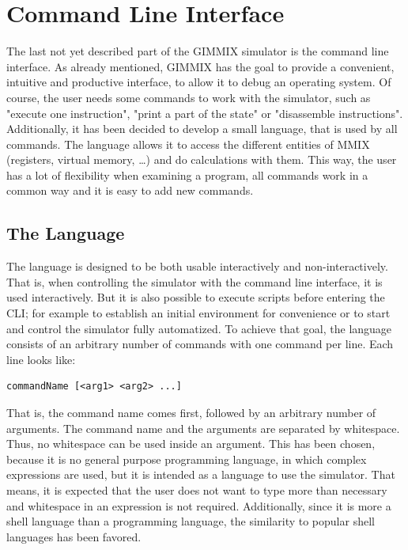 \section{Command Line Interface}

The last not yet described part of the GIMMIX simulator is the command line interface. As already mentioned, GIMMIX has the goal to provide a convenient, intuitive and productive interface, to allow it to debug an operating system. Of course, the user needs some commands to work with the simulator, such as "execute one instruction", "print a part of the state" or "disassemble instructions". Additionally, it has been decided to develop a small language, that is used by all commands. The language allows it to access the different entities of MMIX (registers, virtual memory, \dots) and do calculations with them. This way, the user has a lot of flexibility when examining a program, all commands work in a common way and it is easy to add new commands.

\subsection{The Language}

The language is designed to be both usable interactively and non-interactively. That is, when controlling the simulator with the command line interface, it is used interactively. But it is also possible to execute scripts before entering the CLI; for example to establish an initial environment for convenience or to start and control the simulator fully automatized. To achieve that goal, the language consists of an arbitrary number of commands with one command per line. Each line looks like:
\begin{verbatim}
commandName [<arg1> <arg2> ...]
\end{verbatim}
That is, the command name comes first, followed by an arbitrary number of arguments. The command name and the arguments are separated by whitespace. Thus, no whitespace can be used inside an argument. This has been chosen, because it is no general purpose programming language, in which complex expressions are used, but it is intended as a language to use the simulator. That means, it is expected that the user does not want to type more than necessary and whitespace in an expression is not required. Additionally, since it is more a shell language than a programming language, the similarity to popular shell languages has been favored.

